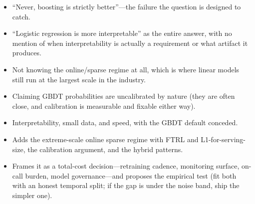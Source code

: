 \begin{interviewq}
\redflags
\begin{itemize}
    \item ``Never, boosting is strictly better''---the failure the question is designed to catch.
    \item ``Logistic regression is more interpretable'' as the entire answer, with no mention of when interpretability is actually a requirement or what artifact it produces.
    \item Not knowing the online/sparse regime at all, which is where linear models still run at the largest scale in the industry.
    \item Claiming GBDT probabilities are uncalibrated by nature (they are often close, and calibration is measurable and fixable either way).
\end{itemize}


\goodgreat
\begin{itemize}
    \item {} Interpretability, small data, and speed, with the GBDT default conceded.
    \item {} Adds the extreme-scale online sparse regime with FTRL and L1-for-serving-size, the calibration argument, and the hybrid patterns.
    \item {} Frames it as a total-cost decision---retraining cadence, monitoring surface, on-call burden, model governance---and proposes the empirical test (fit both with an honest temporal split; if the gap is under the noise band, ship the simpler one).
\end{itemize}

\end{interviewq}


